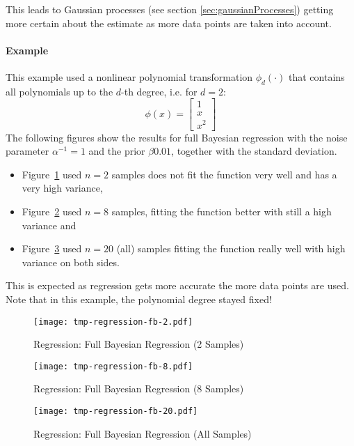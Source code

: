 \documentclass[a4paper, 11pt, accentcolor = tud3b]{tudreport}
\begin{document}
					This leads to Gaussian processes (see section \ref{sec:gaussianProcesses}) getting more certain about the estimate as more data points are taken into account.

				\paragraph{Example}
					This example used a nonlinear polynomial transformation \( \phi_d(\cdot) \) that contains all polynomials up to the \(d\)-th degree, i.e. for \( d = 2 \):
					\begin{equation}
						\phi(x) =
								\begin{bmatrix}
								1 \\
								x \\
								x^2
							\end{bmatrix}
					\end{equation}
					The following figures show the results for full Bayesian regression with the noise parameter \( \alpha^{-1} = 1 \) and the prior \( \beta 0.01 \), together with the standard deviation.
					\begin{itemize}
						\item Figure~\ref{fig:regressionFb2} used \( n = 2 \) samples does not fit the function very well and has a very high variance,
						\item Figure~\ref{fig:regressionFb8} used \( n = 8 \) samples, fitting the function better with still a high variance and
						\item Figure~\ref{fig:regressionFb20} used \( n = 20 \) (all) samples fitting the function really well with high variance on both sides.
					\end{itemize}
					This is expected as regression gets more accurate the more data points are used. Note that in this example, the polynomial degree stayed fixed!
					
					\begin{figure}
						\centering
						\texttt{[image: tmp-regression-fb-2.pdf]}
						\caption{Regression: Full Bayesian Regression (2 Samples)}
						\label{fig:regressionFb2}
					\end{figure}
					\begin{figure}
						\centering
						\texttt{[image: tmp-regression-fb-8.pdf]}
						\caption{Regression: Full Bayesian Regression (8 Samples)}
						\label{fig:regressionFb8}
					\end{figure}
					\begin{figure}
						\centering
						\texttt{[image: tmp-regression-fb-20.pdf]}
						\caption{Regression: Full Bayesian Regression (All Samples)}
						\label{fig:regressionFb20}
					\end{figure}
\end{document}
